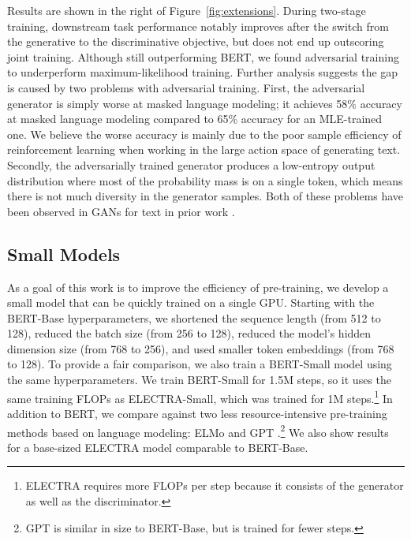 \documentclass{article}
\begin{document}
Results are shown in the right of Figure~\ref{fig:extensions}.
During two-stage training, downstream task performance notably improves after the switch from the generative to the discriminative objective, but does not end up outscoring joint training. 
Although still outperforming BERT, we found adversarial training to underperform maximum-likelihood training.
Further analysis suggests the gap is caused by two problems with adversarial training.
First, the adversarial generator is simply worse at masked language modeling; it achieves 58\% accuracy at masked language modeling compared to 65\% accuracy for an MLE-trained one.
We believe the worse accuracy is mainly due to the poor sample efficiency of reinforcement learning when working in the large action space of generating text.
Secondly, the adversarially trained generator produces a low-entropy output distribution where most of the probability mass is on a single token, which means there is not much diversity in the generator samples. 
Both of these problems have been observed in GANs for text in prior work \citep{Caccia2018LanguageGF}.


\subsection{Small Models}

As a goal of this work is to improve the efficiency of pre-training, we develop a small model that can be quickly trained on a single GPU. 
Starting with the BERT-Base hyperparameters, we shortened the sequence length (from 512 to 128), reduced the batch size (from 256 to 128), reduced the model's hidden dimension size (from 768 to 256), and used smaller token embeddings (from 768 to 128).
To provide a fair comparison, we also train a BERT-Small model using the same hyperparameters.
We train BERT-Small for 1.5M steps, so it uses the same training FLOPs as ELECTRA-Small, which was trained for 1M steps.\footnote{ELECTRA requires more FLOPs per step because it consists of the generator as well as the discriminator.}
In addition to BERT, we compare against two less resource-intensive pre-training methods based on language modeling: ELMo \citep{peters2018deep} and GPT \citep{radford2018improving}.\footnote{GPT is similar in size to BERT-Base, but is trained for fewer steps.}
We also show results for a base-sized ELECTRA model comparable to BERT-Base. 
\end{document}
